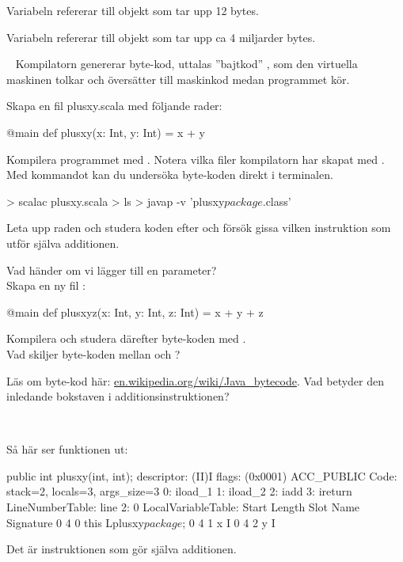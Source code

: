 \SubtaskSolved Variabeln  refererar till objekt som tar upp 12 bytes.

\SubtaskSolved Variabeln  refererar till objekt som tar upp ca 4 miljarder bytes.

\QUESTEND





\QUESTBEGIN

\Task\Uberkurs  \what~  Kompilatorn genererar byte-kod, uttalas ''bajtkod'' , som den virtuella maskinen tolkar och översätter till maskinkod medan programmet kör. 

Skapa en fil plusxy.scala med följande rader:
\begin{Code}
@main
def plusxy(x: Int, y: Int) = x + y
\end{Code}
Kompilera programmet med . Notera vilka filer kompilatorn har skapat med . Med kommandot  kan du undersöka byte-koden direkt i terminalen.
\begin{REPL}
> scalac plusxy.scala
> ls
> javap -v 'plusxy$package$.class'
\end{REPL}

\Subtask Leta upp raden  och studera koden efter  och försök gissa vilken instruktion som utför själva additionen.

\Subtask Vad händer om vi lägger till en parameter? \\ 
Skapa en ny fil :
\begin{Code}
@main
def plusxyz(x: Int, y: Int, z: Int) = x + y + z
\end{Code}
Kompilera och studera därefter byte-koden med . \\ Vad skiljer byte-koden mellan  och ?

\Subtask Läs om byte-kod här: \href{https://en.wikipedia.org/wiki/Java\_bytecode}{en.wikipedia.org/wiki/Java\_bytecode}. Vad betyder den inledande bokstaven i additionsinstruktionen?


\SOLUTION

\TaskSolved \what~

\SubtaskSolved Så här ser funktionen  ut:
\begin{REPL}
public int plusxy(int, int);
  descriptor: (II)I
  flags: (0x0001) ACC_PUBLIC
  Code:
    stack=2, locals=3, args_size=3
       0: iload_1
       1: iload_2
       2: iadd
       3: ireturn
    LineNumberTable:
      line 2: 0
    LocalVariableTable:
      Start  Length  Slot  Name   Signature
          0       4     0  this   Lplusxy$package$;
          0       4     1     x   I
          0       4     2     y   I
\end{REPL}
Det är instruktionen  som gör själva additionen.


